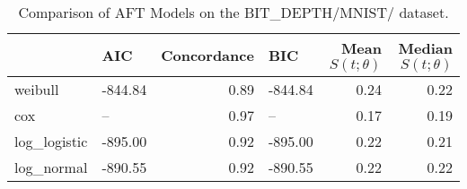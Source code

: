 \begin{table}
\caption{Comparison of AFT Models on the BIT_DEPTH/MNIST/ dataset.}
\label{tab:bit_depth/mnist/}
\begin{tabular}{llrlrr}
\toprule
 & AIC & Concordance & BIC & Mean $S(t;\theta)$ & Median $S(t;\theta)$ \\
\midrule
weibull & -844.84 & 0.89 & -844.84 & 0.24 & 0.22 \\
cox & -- & 0.97 & -- & 0.17 & 0.19 \\
log_logistic & -895.00 & 0.92 & -895.00 & 0.22 & 0.21 \\
log_normal & -890.55 & 0.92 & -890.55 & 0.22 & 0.22 \\
\bottomrule
\end{tabular}
\end{table}
